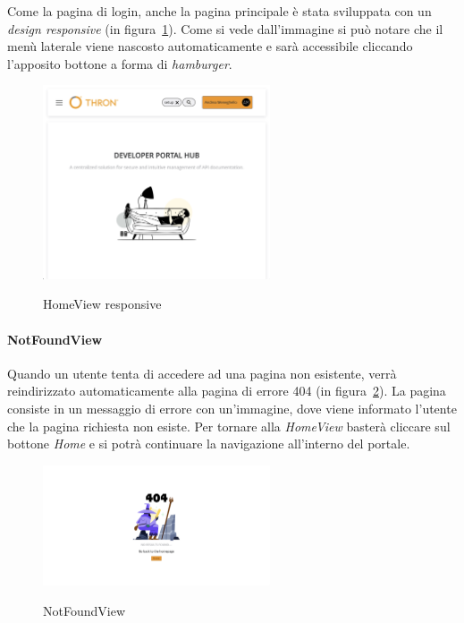 Come la pagina di login, anche la pagina principale è stata sviluppata con un \textit{design responsive} (in figura~\ref{fig:home-view-responsive}).
Come si vede dall'immagine si può notare che il menù laterale viene nascosto automaticamente e sarà accessibile cliccando l'apposito bottone a forma di \textit{hamburger}.

\begin{figure}[ht]
  \centering
  \includegraphics[width=0.6\textwidth, alt={Pagina principale responsive dell'applicazione}]{images/frontend/HomeViewRes.jpg}
  \caption{HomeView responsive}\label{fig:home-view-responsive}
\end{figure}


\paragraph{NotFoundView}\label{par:not-found-view}
Quando un utente tenta di accedere ad una pagina non esistente, verrà reindirizzato automaticamente alla pagina di errore 404 (in figura~\ref{fig:not-found-view}).
La pagina consiste in un messaggio di errore con un'immagine, dove viene informato l'utente che la pagina richiesta non esiste.
Per tornare alla \textit{HomeView} basterà cliccare sul bottone \textit{Home} e si potrà continuare la navigazione all'interno del portale.

\begin{figure}[ht]
  \centering
  \includegraphics[width=0.6\textwidth, alt={Pagina di errore 404}]{images/frontend/NotFoundView.jpg}
  \caption{NotFoundView}\label{fig:not-found-view}
\end{figure}
\pagebreak
